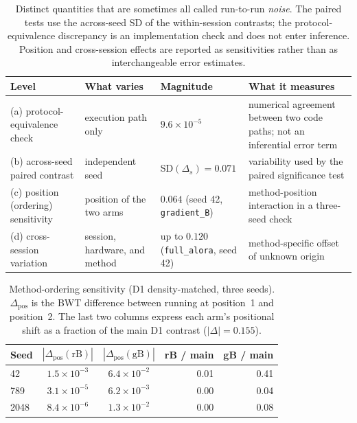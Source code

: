 \begin{table}[h]
\caption{Distinct quantities that are sometimes all called run-to-run \emph{noise}. The paired tests use the across-seed SD of the within-session contrasts; the protocol-equivalence discrepancy is an implementation check and does not enter inference. Position and cross-session effects are reported as sensitivities rather than as interchangeable error estimates.}
\label{tab:noise_levels}
\centering
\small
\begin{tabular}{@{}p{}p{}p{}p{}@{}}
\toprule
\textbf{Level} & \textbf{What varies} & \textbf{Magnitude} & \textbf{What it measures} \\
\midrule
(a) protocol-equivalence check & execution path only & $9.6 \times 10^{-5}$ & numerical agreement between two code paths; not an inferential error term \\
(b) across-seed paired contrast & independent seed & SD$(\Delta_s)=0.071$ & variability used by the paired significance test \\
(c) position (ordering) sensitivity & position of the two arms & $0.064$ (seed 42, \texttt{gradient\_B}) & method-position interaction in a three-seed check \\
(d) cross-session variation & session, hardware, and method & up to $0.120$ (\texttt{full\_alora}, seed 42) & method-specific offset of unknown origin \\
\bottomrule
\end{tabular}
\end{table}

\begin{table}[h]
\caption{Method-ordering sensitivity (D1 density-matched, three seeds). $\Delta_{\text{pos}}$ is the BWT difference between running at position~1 and position~2. The last two columns express each arm's positional shift as a fraction of the main D1 contrast ($|\Delta| = 0.155$).}
\label{tab:method_order}
\centering
\small
\begin{tabular}{@{}lccrr@{}}
\toprule
\textbf{Seed} & $|\Delta_{\text{pos}}(\text{rB})|$ & $|\Delta_{\text{pos}}(\text{gB})|$ & \textbf{rB / main} & \textbf{gB / main} \\
\midrule
42   & $1.5 \times 10^{-3}$ & $6.4 \times 10^{-2}$ & 0.01 & 0.41 \\
789  & $3.1 \times 10^{-5}$ & $6.2 \times 10^{-3}$ & 0.00 & 0.04 \\
2048 & $8.4 \times 10^{-6}$ & $1.3 \times 10^{-2}$ & 0.00 & 0.08 \\
\bottomrule
\end{tabular}
\end{table}

